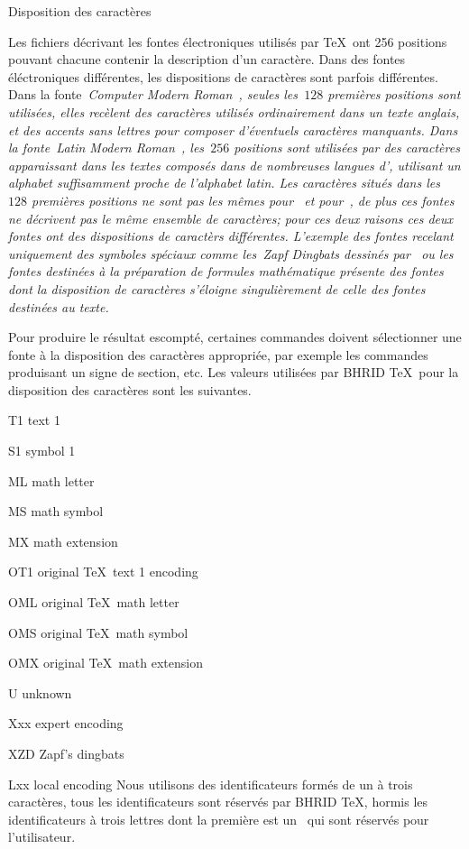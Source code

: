 \formalpar Disposition des caractères

Les fichiers décrivant les fontes électroniques utilisés par \TeX\ ont
256 positions pouvant chacune contenir la description d'un
caractère. Dans des fontes éléctroniques différentes, les dispositions
de caractères sont parfois différentes. Dans la fonte~\em{Computer
Modern Roman}~, seules les~$128$ premières positions sont
utilisées, elles recèlent des caractères utilisés ordinairement dans
un texte anglais, et des accents sans lettres pour composer
d'éventuels caractères manquants. Dans la fonte~\em{Latin Modern
Roman}~, les~$256$ positions sont utilisées par des
caractères apparaissant dans les textes composés dans de nombreuses
langues d', utilisant un alphabet suffisamment proche de
l'alphabet latin. Les caractères situés dans les~$128$ premières
positions ne sont pas les mêmes pour~ et
pour~, de plus ces fontes ne décrivent pas le même
ensemble de caractères; pour ces deux raisons ces deux fontes ont des
dispositions de caractèrs différentes. L'exemple des fontes recelant
uniquement des symboles spéciaux comme les~\em{Zapf Dingbats} dessinés
par~ ou les fontes destinées à la préparation de formules
mathématique présente des fontes dont la disposition de caractères
s'éloigne singulièrement de celle des fontes destinées au texte.

Pour produire le résultat escompté, certaines commandes doivent
sélectionner une fonte à la disposition des caractères appropriée, par
exemple les commandes produisant un signe de section, etc. Les valeurs
utilisées par BHRID \TeX\ pour la disposition des caractères sont les
suivantes.
\beginlist\tag
\item{T1}	text 1
\item{S1}	symbol 1
\item{ML}	math letter
\item{MS}	math symbol
\item{MX}	math extension
\smallskip
\item{OT1}	original \TeX\ text 1 encoding
\item{OML}	original \TeX\ math letter
\item{OMS}	original \TeX\ math symbol
\item{OMX}	original \TeX\ math extension
\smallskip
\item{U}	unknown
\item{Xxx}	expert encoding
\item{XZD}	Zapf's dingbats
\item{Lxx}	local encoding
\endlist
Nous utilisons des identificateurs formés de un à trois caractères,
tous les identificateurs sont réservés par BHRID \TeX, hormis les
identificateurs à trois lettres dont la première est un~ qui
sont réservés pour l'utilisateur.


